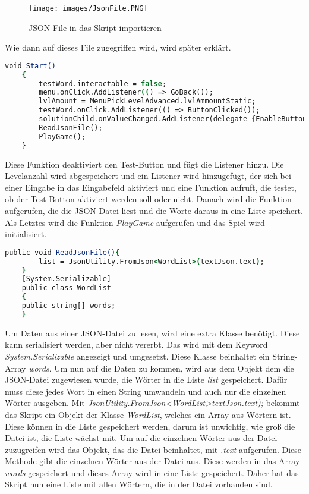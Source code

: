 \begin{figure}[htbp]
  \centering
  \texttt{[image: images/JsonFile.PNG]}
  \caption{JSON-File in das Skript importieren}
  \label{jsonUnity}
\end{figure}
Wie dann auf dieses File zugegriffen wird, wird später erklärt.\\
\begin{lstlisting}[language=csh, caption={WordMix.cs Start-Funktion}]
	void Start()
	{
		testWord.interactable = false;
		menu.onClick.AddListener(() => GoBack());
		lvlAmount = MenuPickLevelAdvanced.lvlAmmountStatic;
		testWord.onClick.AddListener(() => ButtonClicked());
		solutionChild.onValueChanged.AddListener(delegate {EnableButton(); });
		ReadJsonFile();
		PlayGame();
	}
\end{lstlisting}
Diese Funktion deaktiviert den Test-Button und fügt die Listener hinzu. Die Levelanzahl wird abgespeichert und ein Listener wird hinzugefügt, der sich bei einer Eingabe in das Eingabefeld aktiviert und eine Funktion aufruft, die testet, ob der Test-Button aktiviert werden soll oder nicht. Danach wird die Funktion aufgerufen, die die JSON-Datei liest und die Worte daraus in eine Liste speichert. Als Letztes wird die Funktion \textit{PlayGame} aufgerufen und das Spiel wird initialisiert.\\
\begin{lstlisting}[language=csh, caption={WordMix.cs ReadJsonFile-Funktion}]
	public void ReadJsonFile(){
		list = JsonUtility.FromJson<WordList>(textJson.text);
	}
	[System.Serializable]
	public class WordList
	{
	public string[] words;
	}
\end{lstlisting}
Um Daten aus einer JSON-Datei zu lesen, wird eine extra Klasse benötigt. Diese kann serialisiert werden, aber nicht vererbt. Das wird mit dem Keyword \textit{System.Serializable} angezeigt und umgesetzt. Diese Klasse beinhaltet ein String-Array \textit{words}. Um nun auf die Daten zu kommen, wird aus dem Objekt dem die JSON-Datei zugewiesen wurde, die Wörter in die Liste \textit{list} gespeichert. Dafür muss diese jedes Wort in einen String umwandeln und auch nur die einzelnen Wörter ausgeben. Mit \textit{JsonUtility.FromJson<WordList>textJson.text);} bekommt das Skript ein Objekt der Klasse \textit{WordList}, welches ein Array aus Wörtern ist. Diese können in die Liste gespeichert werden, darum ist unwichtig, wie groß die Datei ist, die Liste wächst mit. Um auf die einzelnen Wörter aus der Datei zuzugreifen wird das Objekt, das die Datei beinhaltet, mit \textit{.text} aufgerufen. Diese Methode gibt die einzelnen Wörter aus der Datei aus. Diese werden in das Array \textit{words} gespeichert und dieses Array wird in eine Liste gespeichert. Daher hat das Skript nun eine Liste mit allen Wörtern, die in der Datei vorhanden sind.\\
